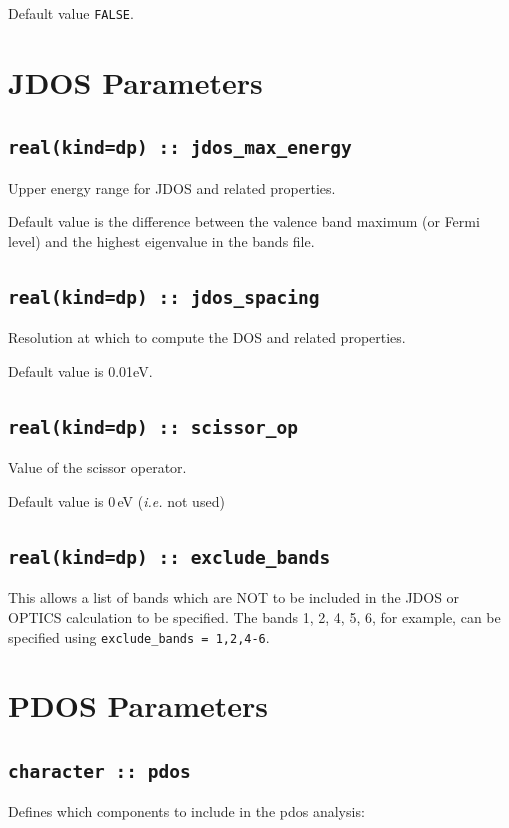 \documentclass[a4paper,11pt,twoside]{book}
\begin{document}
{Default value \verb#FALSE#.



\section{JDOS Parameters}

\subsection[jdos\_max\_energy]{\tt real(kind=dp) :: jdos\_max\_energy}
Upper energy range for JDOS and related properties.

Default value is the difference between the valence band maximum (or
Fermi level) and the highest eigenvalue in the bands file.

\subsection[jdos\_spacing]{\tt real(kind=dp) :: jdos\_spacing}
Resolution at which to compute the DOS and related properties.

Default value is 0.01eV.

\subsection[scissor\_op]{\tt real(kind=dp) :: scissor\_op}
Value of the scissor operator.

Default value is 0\,eV (\emph{i.e.} not used)

\subsection[exclude\_bands]{\tt real(kind=dp) :: exclude\_bands}
This allows a list of bands which are NOT to be included in the JDOS or OPTICS calculation to be specified.  The bands 1, 2, 4, 5, 6, for example, can be specified using \verb#exclude_bands = 1,2,4-6#.

\section{PDOS Parameters}

\subsection[pdos]{\tt character :: pdos}
Defines which components to include in the pdos analysis:

}
\end{document}
